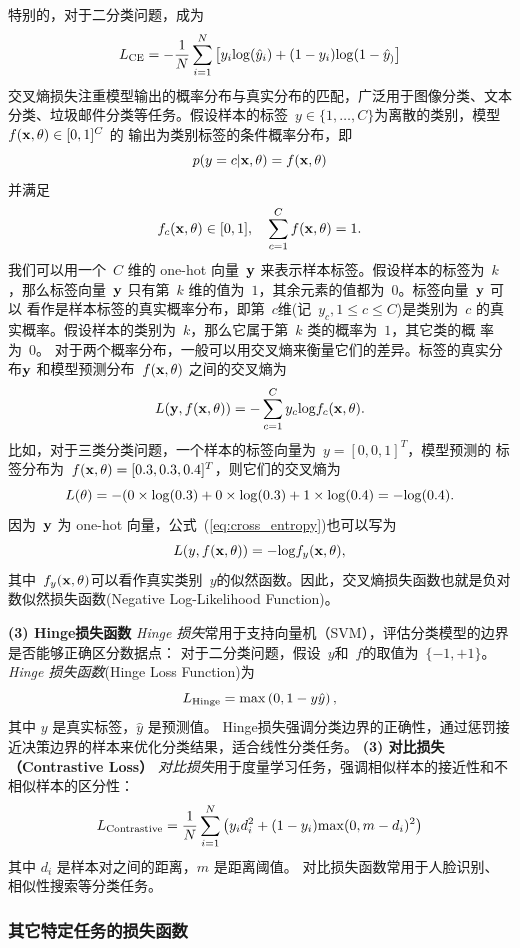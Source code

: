 特别的，对于二分类问题，成为
$$
L_{\rm CE} =-\frac{1}{N}\sum_{i=1}^N \left[  y_i {\rm log}(\hat{y}_i) +(1-y_i){\rm log}(1-\hat{y}_)\right]
$$
交叉熵损失注重模型输出的概率分布与真实分布的匹配，广泛用于图像分类、文本分类、垃圾邮件分类等任务。假设样本的标签~$y \in \{1, \dots, C\}$为离散的类别，模型~$f({\bf x},\theta) \in [0, 1]^C$ 的 输出为类别标签的条件概率分布，即
$$
p(y=c|{\bf x}, \theta)=f({\bf x},\theta)
$$
并满足
$$
f_c({\bf x},\theta)\in [0,1], \quad \sum_{c=1}^C f({\bf x},\theta)=1.
$$
我们可以用一个~$C$ 维的 one-hot 向量~${\bf  y}$ 来表示样本标签。假设样本的标签为~$k$，那么标签向量~${\bf y}$ 只有第~$k$ 维的值为~$1$，其余元素的值都为~$0$。标签向量~${\bf y}$ 可以 看作是样本标签的真实概率分布，即第~$c$维(记~$y_c, 1 \le c \le C$)是类别为~$c$ 的真实概率。假设样本的类别为~$k$，那么它属于第~$k$ 类的概率为~$1$，其它类的概 率为~$0$。
对于两个概率分布，一般可以用交叉熵来衡量它们的差异。标签的真实分 布${\bf y}$ 和模型预测分布~$f({\bf x},\theta)$ 之间的交叉熵为
\begin{equation}\label{eq:cross_entropy}
L({\bf y}, f({\bf x},\theta))=-\sum_{c=1}^C y_c {\rm log} f_c({\bf x},\theta).
\end{equation}
比如，对于三类分类问题，一个样本的标签向量为~$y = [0,0,1]^T$，模型预测的 标签分布为~$f({\bf x},\theta) = [0.3, 0.3, 0.4]^T$，则它们的交叉熵为
$$
L(\theta) = -( 0 \times {\rm log}(0.3)+0\times {\rm log}(0.3)+1\times {\rm log}(0.4)= -{\rm log}(0.4).
$$
因为~$ {\bf y}$ 为 one-hot 向量，公式~(\ref{eq:cross_entropy})也可以写为
$$ L(y, f({\bf x},\theta)) = - {\rm log} f_y({\bf x},\theta),$$
其中~$ f_y({\bf x},\theta)$可以看作真实类别~$y$的似然函数。因此，交叉熵损失函数也就是负对数似然损失函数(Negative Log-Likelihood Function)。

{\bf (3) Hinge损失函数}
{\em Hinge 损失}常用于支持向量机（SVM），评估分类模型的边界是否能够正确区分数据点：
对于二分类问题，假设~$y$和~$f$的取值为~$\{-1,+1\}$。
{\em Hinge 损失函数}(Hinge Loss Function)为
$$
L_{\rm Hinge} = {\rm max} \left(0, 1 - y\hat{y}\right), %
$$
其中 $y$ 是真实标签，$\hat{y}$ 是预测值。
Hinge损失强调分类边界的正确性，通过惩罚接近决策边界的样本来优化分类结果，适合线性分类任务。
{\bf (3) 对比损失（Contrastive Loss）} {\em 对比损失}用于度量学习任务，强调相似样本的接近性和不相似样本的区分性：
$$
L_{\rm Contrastive} = \frac{1}{N} \sum_{i=1}^N \left( y_i d_i^2+(1-y_i){\rm max}(0, m-d_i)^2\right)
$$
其中 $d_i$ 是样本对之间的距离，$m$ 是距离阈值。
对比损失函数常用于人脸识别、相似性搜索等分类任务。
\subsubsection*{其它特定任务的损失函数}

